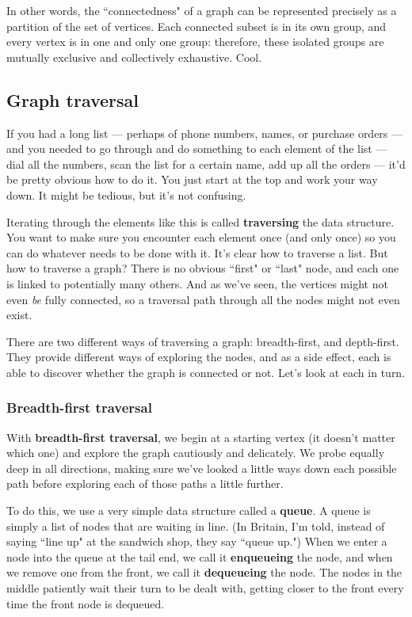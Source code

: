 In other words, the ``connectedness" of a graph can be represented
precisely as a partition of the set of vertices. Each connected subset is
in its own group, and every vertex is in one and only one group: therefore,
these isolated groups are mutually exclusive and collectively exhaustive.
Cool.

\subsection{Graph traversal}

If you had a long list --- perhaps of phone numbers, names, or purchase
orders --- and you needed to go through and do something to each element of
the list --- dial all the numbers, scan the list for a certain name, add up
all the orders --- it'd be pretty obvious how to do it. You just start at
the top and work your way down. It might be tedious, but it's not
confusing.

Iterating through the elements like this is called \textbf{traversing} the
data structure. You want to make sure you encounter each element once (and
only once) so you can do whatever needs to be done with it. It's clear how
to traverse a list. But how to traverse a graph? There is no obvious
``first" or ``last" node, and each one is linked to potentially many
others. And as we've seen, the vertices might not even \textit{be} fully
connected, so a traversal path through all the nodes might not even exist.

There are two different ways of traversing a graph: breadth-first, and
depth-first. They provide different ways of exploring the nodes, and as a
side effect, each is able to discover whether the graph is connected or
not. Let's look at each in turn.

\subsubsection{Breadth-first traversal}

With \textbf{breadth-first traversal}, we begin at a starting vertex (it
doesn't matter which one) and explore the graph cautiously and delicately.
We probe equally deep in all directions, making sure we've looked a little
ways down each possible path before exploring each of those paths a little
further.

To do this, we use a very simple data structure called a \textbf{queue}. A
queue is simply a list of nodes that are waiting in line. (In Britain, I'm
told, instead of saying ``line up" at the sandwich shop, they say ``queue
up.") When we enter a node into the queue at the tail end, we call it
\textbf{enqueueing} the node, and when we remove one from the front, we
call it \textbf{dequeueing} the node. The nodes in the middle patiently
wait their turn to be dealt with, getting closer to the front every time
the front node is dequeued. 

